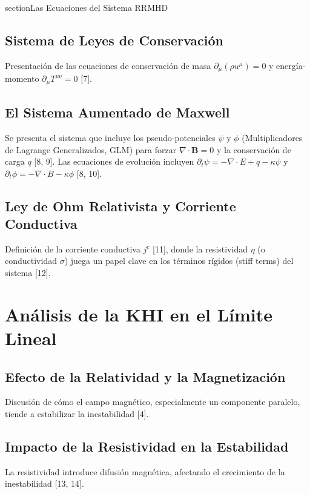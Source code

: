 section{Las Ecuaciones del Sistema RRMHD}
    \subsection{Sistema de Leyes de Conservación}
        Presentación de las ecuaciones de conservación de masa $\partial_\mu(\rho u^\mu)=0$ y energía-momento $\partial_\mu T^{\mu\nu}=0$ [7].
    \subsection{El Sistema Aumentado de Maxwell}
        Se presenta el sistema que incluye los pseudo-potenciales $\psi$ y $\phi$ (Multiplicadores de Lagrange Generalizados, GLM) para forzar $\nabla \cdot \mathbf{B}=0$ y la conservación de carga $q$ [8, 9]. Las ecuaciones de evolución incluyen $\partial_t \psi = -\nabla \cdot E + q - \kappa \psi$ y $\partial_t \phi = -\nabla \cdot B - \kappa \phi$ [8, 10].
    \subsection{Ley de Ohm Relativista y Corriente Conductiva}
        Definición de la corriente conductiva $j^c$ [11], donde la resistividad $\eta$ (o conductividad $\sigma$) juega un papel clave en los términos rígidos (stiff terms) del sistema [12].

\section{Análisis de la KHI en el Límite Lineal}
    \subsection{Efecto de la Relatividad y la Magnetización}
        Discusión de cómo el campo magnético, especialmente un componente paralelo, tiende a estabilizar la inestabilidad [4].
    \subsection{Impacto de la Resistividad en la Estabilidad}
        La resistividad introduce difusión magnética, afectando el crecimiento de la inestabilidad [13, 14].

